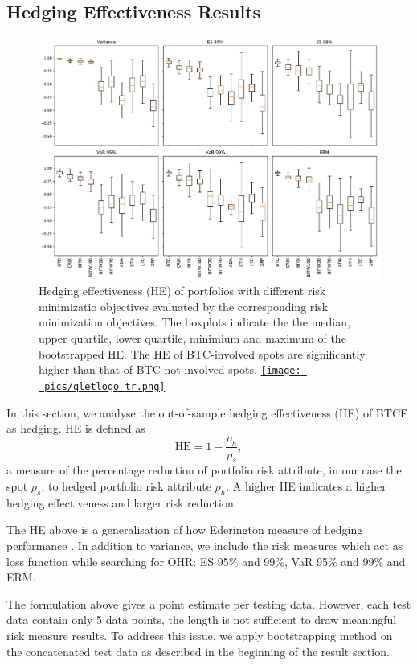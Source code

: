 \subsection{Hedging Effectiveness Results}\label{sec: HE results}
\begin{figure}[t]
\includegraphics[width=\textwidth]{_pics/ES5_HE_boxplot.pdf}
  \caption{Hedging effectiveness (HE) of portfolios with different risk minimizatio objectives evaluated by the corresponding risk minimization objectives.
            The boxplots indicate the the median, upper quartile, lower quartile, minimium and maximum of the bootstrapped HE.
            The HE of BTC-involved spots are significantly higher than that of BTC-not-involved spots.
  \href{http://www.quantlet.com/}{\texttt{[image: \_pics/qletlogo\_tr.png]}} }
\label{fig:HEboxplot}
\end{figure}
In this section, we analyse the out-of-sample hedging effectiveness (HE) of BTCF as hedging.
HE is defined as $$\text{HE} = 1-\frac{\rho_h}{\rho_s},$$
a measure of the percentage reduction of portfolio risk attribute, in our case the spot $\rho_s$,
to hedged portfolio risk attribute $\rho_h$.
A higher HE indicates a higher hedging effectiveness and larger risk reduction. \medskip

The HE above is a generalisation of how Ederington measure of hedging performance \citep{ederington1979hedging}.
In addition to variance, we include the risk measures which act as loss function while searching for OHR: ES 95\% and 99\%, VaR 95\% and 99\% and ERM.

The formulation above gives a point estimate per testing data.
However, each test data contain only 5 data points, the length is not sufficient to draw meaningful risk measure results.
To address this issue, we apply bootstrapping method on the concatenated test data as described in the beginning of the result section. \medskip

